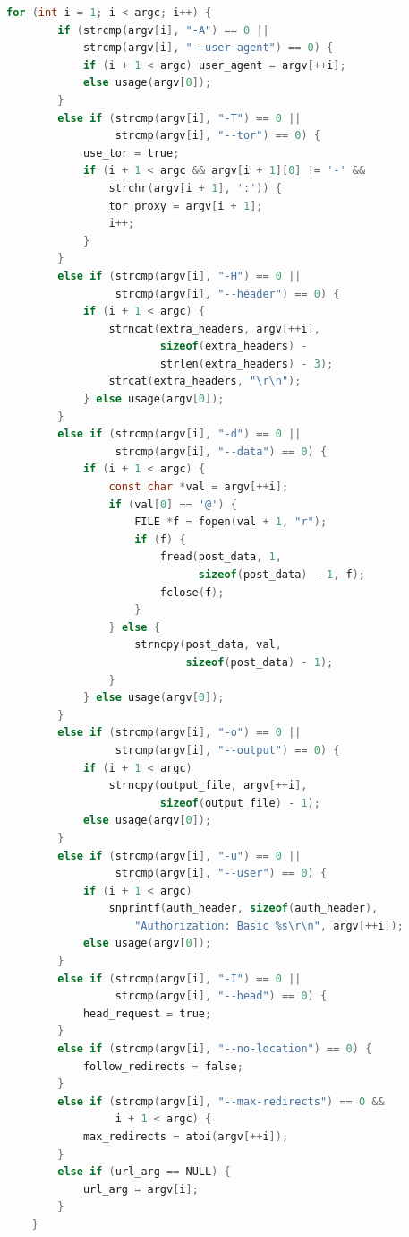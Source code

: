 \begin{lstlisting}[style=oldcode,language=C,firstnumber=last]
    for (int i = 1; i < argc; i++) {
        if (strcmp(argv[i], "-A") == 0 ||
            strcmp(argv[i], "--user-agent") == 0) {
            if (i + 1 < argc) user_agent = argv[++i];
            else usage(argv[0]);
        }
        else if (strcmp(argv[i], "-T") == 0 ||
                 strcmp(argv[i], "--tor") == 0) {
            use_tor = true;
            if (i + 1 < argc && argv[i + 1][0] != '-' &&
                strchr(argv[i + 1], ':')) {
                tor_proxy = argv[i + 1];
                i++;
            }
        }
        else if (strcmp(argv[i], "-H") == 0 ||
                 strcmp(argv[i], "--header") == 0) {
            if (i + 1 < argc) {
                strncat(extra_headers, argv[++i],
                        sizeof(extra_headers) -
                        strlen(extra_headers) - 3);
                strcat(extra_headers, "\r\n");
            } else usage(argv[0]);
        }
        else if (strcmp(argv[i], "-d") == 0 ||
                 strcmp(argv[i], "--data") == 0) {
            if (i + 1 < argc) {
                const char *val = argv[++i];
                if (val[0] == '@') {
                    FILE *f = fopen(val + 1, "r");
                    if (f) {
                        fread(post_data, 1,
                              sizeof(post_data) - 1, f);
                        fclose(f);
                    }
                } else {
                    strncpy(post_data, val,
                            sizeof(post_data) - 1);
                }
            } else usage(argv[0]);
        }
        else if (strcmp(argv[i], "-o") == 0 ||
                 strcmp(argv[i], "--output") == 0) {
            if (i + 1 < argc)
                strncpy(output_file, argv[++i],
                        sizeof(output_file) - 1);
            else usage(argv[0]);
        }
        else if (strcmp(argv[i], "-u") == 0 ||
                 strcmp(argv[i], "--user") == 0) {
            if (i + 1 < argc)
                snprintf(auth_header, sizeof(auth_header),
                    "Authorization: Basic %s\r\n", argv[++i]);
            else usage(argv[0]);
        }
        else if (strcmp(argv[i], "-I") == 0 ||
                 strcmp(argv[i], "--head") == 0) {
            head_request = true;
        }
        else if (strcmp(argv[i], "--no-location") == 0) {
            follow_redirects = false;
        }
        else if (strcmp(argv[i], "--max-redirects") == 0 &&
                 i + 1 < argc) {
            max_redirects = atoi(argv[++i]);
        }
        else if (url_arg == NULL) {
            url_arg = argv[i];
        }
    }


\end{lstlisting}
